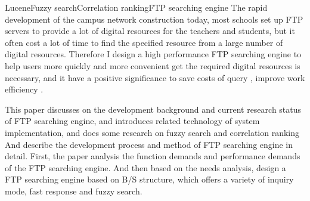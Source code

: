 
\begin{Eabstract}{Lucene}{Fuzzy search}{Correlation ranking}{FTP searching engine}{}
The rapid development of the campus network construction today, most schools set up FTP servers to provide a lot of digital resources for the teachers and students, but it often cost a lot of time to find the specified resource from a large number of digital resources. Therefore I design a high performance FTP searching engine to help users more quickly and more convenient get the required digital resources is necessary, and it have a positive significance to save costs of query , improve work efficiency .

This paper discusses on the development background and current research status of FTP searching engine, and introduces related technology of system implementation, and does some research on fuzzy search and correlation ranking And describe the development process and method of FTP searching engine in detail. First, the paper analysis the function demands and performance demands of the FTP searching engine. And then based on the needs analysis, design a FTP searching engine based on B/S structure, which offers a variety of inquiry mode, fast response and fuzzy search.

\end{Eabstract}
